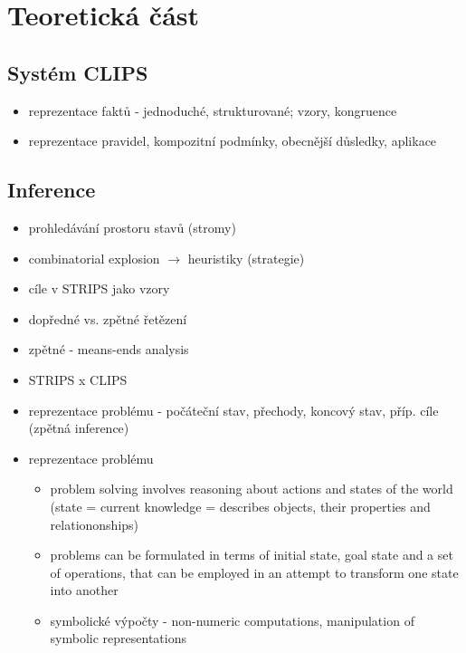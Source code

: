 \section{Teoretická část}



\subsection{Systém CLIPS}
\begin{framed}
  \begin{itemize}
    \item reprezentace faktů - jednoduché, strukturované; vzory, kongruence
    \item reprezentace pravidel, kompozitní podmínky, obecnější důsledky,
      aplikace
  \end{itemize}
\end{framed}

\subsection{Inference}
\begin{framed}
  \begin{itemize}
    \item prohledávání prostoru stavů (stromy)
    \item combinatorial explosion $\rightarrow$ heuristiky (strategie)
    \item cíle v STRIPS jako vzory
    \item dopředné vs. zpětné řetězení
    \item zpětné - means-ends analysis
    \item STRIPS x CLIPS
    \item reprezentace problému - počáteční stav, přechody, koncový stav,
      příp. cíle (zpětná inference)
    \item reprezentace problému
      \begin{itemize}
        \item problem solving involves reasoning about actions and states of the
          world (state = current knowledge = describes objects, their properties and
          relationonships)
        \item problems can be formulated in terms of initial state, goal state
          and a set of operations, that can be employed in an attempt to
          transform one state into another
        \item symbolické výpočty - non-numeric computations, manipulation of
          symbolic representations
      \end{itemize}
  \end{itemize}
\end{framed}

